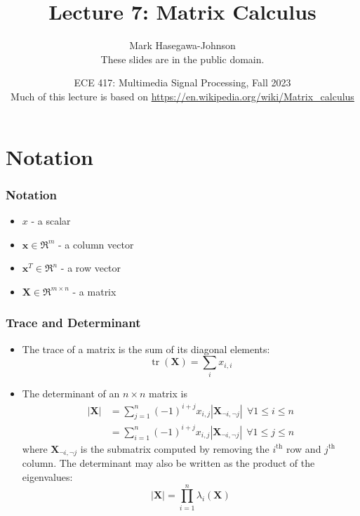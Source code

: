 \documentclass{beamer}
\title{Lecture 7: Matrix Calculus}
\author{Mark Hasegawa-Johnson\\These slides are in the public domain.}
\date{ECE 417: Multimedia Signal Processing, Fall 2023\\Much of this lecture is based on \url{https://en.wikipedia.org/wiki/Matrix_calculus}}
\DeclareMathOperator{\tr}{tr}
\begin{document}
\begin{frame}
  \maketitle
\end{frame}

\begin{frame}
  \tableofcontents
\end{frame}

\section{Notation}
\setcounter{subsection}{1}

\begin{frame}
  \frametitle{Notation}
  \begin{itemize}
  \item $x$ - a scalar
  \item $\mathbf{x}\in\Re^m$ - a column vector
  \item $\mathbf{x}^T\in\Re^n$ - a row vector
  \item $\mathbf{X}\in\Re^{m\times n}$ - a matrix
  \end{itemize}
\end{frame}

\begin{frame}
  \frametitle{Trace and Determinant}
  \begin{itemize}
  \item The trace of a matrix is the sum of its diagonal elements:
    \begin{displaymath}
      \tr(\mathbf{X})=\sum_i x_{i,i}
    \end{displaymath}
  \item The determinant of an $n\times n$ matrix is
    \begin{align*}
      \left|\mathbf{X}\right|
      &=\sum_{j=1}^n (-1)^{i+j} x_{i,j}\left|\mathbf{X}_{\neg i,\neg j}\right|~~\forall 1\le i\le n\\
      &=\sum_{i=1}^n (-1)^{i+j} x_{i,j}\left|\mathbf{X}_{\neg i,\neg j}\right|~~\forall 1\le j\le n
    \end{align*}
    where $\mathbf{X}_{\neg i,\neg j}$ is the submatrix computed by
    removing the $i^{\text{th}}$ row and $j^{\text{th}}$ column.  The
    determinant may also be written as the product of the eigenvalues:
    \begin{displaymath}
      \left|\mathbf{X}\right| = \prod_{i=1}^n \lambda_i(\mathbf{X})
    \end{displaymath}
  \end{itemize}
\end{frame}
\end{document}
